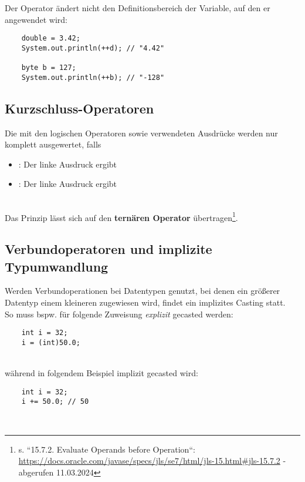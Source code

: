 \noindent
Der Operator ändert nicht den Definitionsbereich der Variable, auf den er angewendet wird:

\begin{verbatim}
    double = 3.42;
    System.out.println(++d); // "4.42"

    byte b = 127;
    System.out.println(++b); // "-128"
\end{verbatim}



\subsection{Kurzschluss-Operatoren}
Die mit den logischen Operatoren \code{&&} sowie \code{||} verwendeten Ausdrücke werden nur komplett ausgewertet, falls

\begin{itemize}
    \item \code{&&}: Der linke Ausdruck  ergibt
    \item \code{||}: Der linke Ausdruck  ergibt
\end{itemize}\\

\noindent
Das Prinzip lässt sich auf den \textbf{ternären Operator}  übertragen\footnote{
s. ``15.7.2. Evaluate Operands before Operation``: \url{https://docs.oracle.com/javase/specs/jls/se7/html/jls-15.html#jls-15.7.2} - abgerufen 11.03.2024
}.


\subsection{Verbundoperatoren und implizite Typumwandlung}

Werden Verbundoperationen bei Datentypen genutzt, bei denen ein größerer Datentyp einem kleineren zugewiesen wird, findet ein implizites Casting statt.\\

\noindent
So muss bspw. für folgende Zuweisung \textit{explizit} gecasted werden:

\begin{verbatim}
    int i = 32;
    i = (int)50.0;
\end{verbatim}\\

während in folgendem Beispiel implizit gecasted wird:

\begin{verbatim}
    int i = 32;
    i += 50.0; // 50
\end{verbatim}\\
